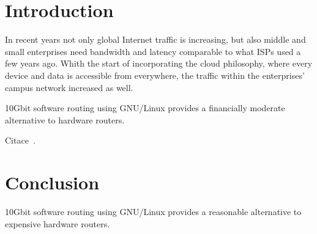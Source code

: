 
\chapter{Introduction}
In recent years not only global Internet traffic is increasing, but also middle and small enterprises
need bandwidth and latency comparable to what ISPs used a few years ago.
Whith the start of incorporating the cloud philosophy, where every device and data is accessible from everywhere,
the traffic within the enterprises' campus network increased as well.

10Gbit software routing using GNU/Linux provides a financially moderate alternative to hardware routers.

Citace~\cite{ipv6ready-db}.

%

%

%

%

%

%


\chapter{Conclusion}
10Gbit software routing using GNU/Linux provides a reasonable alternative to expensive hardware routers.
